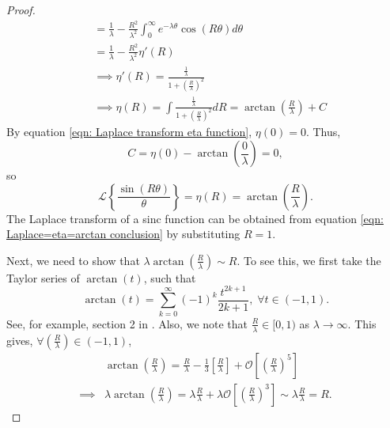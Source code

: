 \documentclass[%
 reprint,
 amsmath,amssymb,
 aps,
]{revtex4-2}
\begin{document}
\begin{proof}
\begin{align*}
    & = \frac{1}{\lambda} - \frac{R^2}{\lambda^2}\int_0^\infty e^{-\lambda\theta} \cos(R\theta) d\theta \\
    & = \frac{1}{\lambda} - \frac{R^2}{\lambda^2} \eta'(R)\\
    & \implies \eta'(R) = \frac{\frac{1}{\lambda}}{1 + \left(\frac{R}{\lambda} \right)^2}\\
    & \implies \eta(R) = \int \frac{\frac{1}{\lambda}}{1 + \left(\frac{R}{\lambda} \right)^2} dR = \arctan\left(\frac{R}{\lambda} \right) + C
\end{align*}
By equation \eqref{eqn: Laplace transform eta function}, $\eta(0) = 0$. Thus,
\begin{equation*}
    C = \eta(0) - \arctan\left(\frac{0}{\lambda} \right) = 0,
\end{equation*}
so
\begin{equation} \label{eqn: Laplace=eta=arctan conclusion}
    \mathcal{L}\left\{\frac{\sin(R\theta)}{\theta}\right\} = \eta(R) = \arctan\left(\frac{R}{\lambda} \right).
\end{equation}
The Laplace transform of a sinc function can be obtained from equation \eqref{eqn: Laplace=eta=arctan conclusion} by substituting $R=1$.

Next, we need to show that $\lambda \arctan\left(\frac{R}{\lambda} \right) \sim R$. To see this, we first take the Taylor series of $\arctan(t)$, such that
\begin{equation*}
    \arctan(t) = \sum_{k = 0}^\infty (-1)^k \frac{t^{2k+1}}{2k+1}, \; \forall t \in (-1, 1).
\end{equation*}
See, for example, section 2 in \cite{nimbran2015taylor}. Also, we note that $\displaystyle \frac{R}{\lambda} \in [0, 1)$ as $\lambda \to \infty$. This gives, $\displaystyle \forall \left(\frac{R}{\lambda}\right) \in (-1, 1)$,
\begin{align*}
    & \arctan\left(\frac{R}{\lambda} \right) 
    = \frac{R}{\lambda} - \frac{1}{3}\left[\frac{R}{\lambda} \right] + \mathcal{O}\left[\left(\frac{R}{\lambda} \right)^5 \right] \\
    \implies & \lambda \arctan\left(\frac{R}{\lambda} \right) = \lambda \frac{R}{\lambda} + \lambda \mathcal{O}\left[\left(\frac{R}{\lambda} \right)^3 \right] \sim \lambda \frac{R}{\lambda} = R.
\end{align*}
\end{proof}
\end{document}
